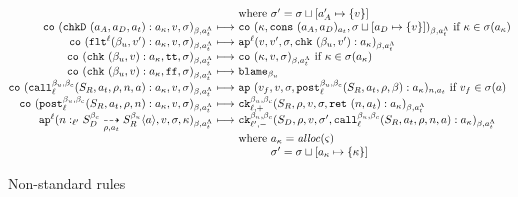 \documentclass[preprint,onecolumn,9pt]{sigplanconf} %
\begin{document}
\begin{figure*}
\begin{gather*}
\begin{array}{@{}r@{\ }c@{\ }l@{}}
      &&\text{where } \msto' = \ext{\msto}{\maddr'_A}{\setof{\mval}}
      \\
      \co{\spush{\kchkD{\maddr_A, \maddr_D, \mtimeline}}{\mkaddr}, \mval, \msto}
         {\msmlab}{\mstimeline}
       &\machstep&
      \co{\mkont, \vconst{\maddr_A}{\maddr_D}{\mtimeline}, \ext{\msto}{\maddr_D}{\setof{\mval}}}
         {\msmlab}{\mstimeline}
        \text{ if } \mkont \in \msto(\mkaddr)
      \\
      \co{\spush{\kflat[^\mlab]{\mmlab_u, \mval'}}{\mkaddr}, \mval, \msto}{\msmlab}{\mstimeline} &\machstep&
      \ap[^\mlab]{\mval, \mval', \msto, \spush{\kcheck{\mmlab_u, \mval'}}{\mkaddr}}{\msmlab}{\mstimeline}
      \\
      \co{\spush{\kcheck{\mmlab_u, \mval}}{\mkaddr}, \strue, \msto}{\msmlab}{\mstimeline} &\machstep&
      \co{\mkont, \mval, \msto}{\msmlab}{\mstimeline} \text{ if } \mkont \in \msto(\mkaddr)
      \\
      \co{\spush{\kcheck{\mmlab_u, \mval}}{\mkaddr}, \sfalse, \msto}{\msmlab}{\mstimeline} &\machstep&
      \sblame{\mmlab_u}
      \\
      \co{\spush{\kmcall{\mmlab_u}{\mmlab_c}{\mlab}{\mscon_R, \mtimeline, \menv, \mname, \maddr}}{\mkaddr},
          \mval,
          \msto}{\msmlab}{\mstimeline} &\machstep&
      \ap{\mval_f,
          \mval,
          \msto,
          \spush{\kpost[^{\mmlab_u, \mmlab_c}_\mlab]{\mscon_R, \mtimeline, \menv, \msmlab}}{\mkaddr}}
         {\mname}{\mtimeline}
        \text{ if } \mval_f \in \msto(\maddr)
      \\
      \co{\spush{\kpost[^{\mmlab_u, \mmlab_c}_\mlab]{\mscon_R, \mtimeline, \menv, \mname}}{\mkaddr}, \mval, \msto}
         {\msmlab}{\mstimeline}
       &\machstep&
      \ck{\mmlab_u}{\mmlab_c}{\mlab}{+}
         {\mscon_R, \menv, \mval, \msto, \spush{\krt{\mname, \mtimeline}}{\mkaddr}}
         {\msmlab}{\mstimeline}
      \\
      \ap[^\mlab]{\blclos{\mname}{\mmlab_u}{\mmlab_c}{\mlab'}{\mscon_D}{\mscon_R}{\menv}{\mtimeline}{\maddr},
                  \mval,
                  \msto,
                  \mkont}
                 {\msmlab}{\mstimeline} &\machstep&
      \ck{\mmlab_u}{\mmlab_c}{\mlab'}{-}
         {\mscon_D, \menv, \mval, \msto',
          \spush{\kmcall{\mmlab_u}{\mmlab_c}{\mlab}{\mscon_R, \mtimeline, \menv, \mname, \maddr}}{\mkaddr}}
         {\msmlab}{\mstimeline} \\
      &&\text{where } \mkaddr = \alloc(\mstate) \\
      &&\phantom{\text{where }} \msto' = \ext{\msto}{\mkaddr}{\setof{\mkont}}
    \end{array}
  \end{gather*}
  \caption{Non-standard rules}
\label{fig:concrete}
\end{figure*}
%
%
%

% 
\end{document}
